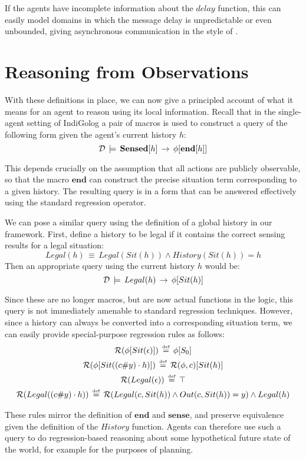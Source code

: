 If the agents have incomplete information about the $delay$ function,
this can easily model domains in which the message delay is unpredictable
or even unbounded, giving asynchronous communication in the style
of \citep{halpern90knowledge_distrib}.


\section{Reasoning from Observations\label{sec:Observations:Reasoning}}

With these definitions in place, we can now give a principled account
of what it means for an agent to reason using its local information.
Recall that in the single-agent setting of IndiGolog \citep{giacomo99indigolog}
a pair of macros is used to construct a query of the following form
given the agent's current history $h$:\[
\mathcal{D}\,\models\,\mathbf{Sensed}[h]\,\rightarrow\,\phi[\mathbf{end}[h]]\]


This depends crucially on the assumption that all actions are publicly
observable, so that the macro $\mathbf{end}$ can construct the precise
situation term corresponding to a given history. The resulting query
is in a form that can be answered effectively using the standard regression
operator.

We can pose a similar query using the definition of a global history
in our framework. First, define a history to be legal if it contains
the correct sensing results for a legal situation:\[
Legal(h)\,\equiv\, Legal(Sit(h))\wedge History(Sit(h))=h\]
 Then an appropriate query using the current history $h$ would be:\[
\mathcal{D}\,\models\, Legal(h)\,\rightarrow\,\phi[Sit(h)]\]


Since these are no longer macros, but are now actual functions in
the logic, this query is not immediately amenable to standard regression
techniques. However, since a history can always be converted into
a corresponding situation term, we can easily provide special-purpose
regression rules as follows: \begin{gather*}
\mathcal{R}(\phi[Sit(\epsilon)])\,\stackrel{\mbox{\tiny def}}{=}\,\phi[S_{0}]\\
\mathcal{R}(\phi[Sit((c\#y)\cdot h)])\,\stackrel{\mbox{\tiny def}}{=}\,\mathcal{R}(\phi,c)[Sit(h)]\\
\mathcal{R}(Legal(\epsilon))\,\stackrel{\mbox{\tiny def}}{=}\,\top\\
\mathcal{R}(Legal((c\#y)\cdot h))\,\stackrel{\mbox{\tiny def}}{=}\,\mathcal{R}(Legal(c,Sit(h))\wedge Out(c,Sit(h))=y)\wedge Legal(h)\end{gather*}


These rules mirror the definition of $\mathbf{end}$ and $\mathbf{sense}$,
and preserve equivalence given the definition of the $History$ function.
Agents can therefore use such a query to do regression-based reasoning
about some hypothetical future state of the world, for example for
the purposes of planning.

